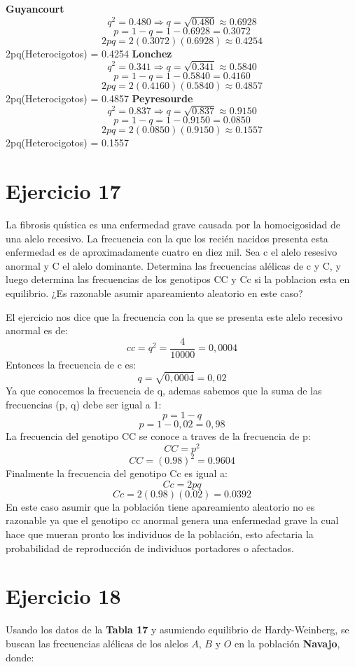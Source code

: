 \documentclass{article}
\begin{document}
\textbf{Guyancourt}
\[q^2 = 0.480 \Longrightarrow q = \sqrt{0.480} \approx 0.6928\]
\[p = 1 - q = 1 - 0.6928 = 0.3072\]
\[2pq = 2(0.3072)(0.6928) \approx 0.4254\]
2pq(Heterocigotos) = 0.4254
\textbf{Lonchez}
\[q^2 = 0.341\Longrightarrow q = \sqrt{0.341} \approx 0.5840\]
\[p = 1 - q = 1 - 0.5840 = 0.4160\]
\[2pq = 2(0.4160)(0.5840) \approx 0.4857\]
2pq(Heterocigotos) = 0.4857
\textbf{Peyresourde}
\[q^2 = 0.837 \Longrightarrow q = \sqrt{0.837} \approx 0.9150\]
\[p = 1 - q = 1 - 0.9150 = 0.0850\]
\[2pq = 2(0.0850)(0.9150) \approx 0.1557\]
2pq(Heterocigotos) = 0.1557


\section*{Ejercicio 17}
La fibrosis quística es una enfermedad grave causada por la homocigosidad de una alelo recesivo. La frecuencia con la que los recién nacidos presenta esta enfermedad es de aproximadamente cuatro en diez mil. Sea c el alelo resesivo anormal y C el alelo dominante. Determina las frecuencias alélicas de c y C, y luego determina las frecuencias de los genotipos CC y Cc si la poblacion esta en equilibrio. ¿Es razonable asumir apareamiento aleatorio en este caso?

El ejercicio nos dice que la frecuencia con la que se presenta este alelo recesivo anormal es de:
\[
cc = q^2 =\frac{4}{10000} = 0,0004
\]
Entonces la frecuencia de c es:
\[
q = \sqrt{0,0004} = 0,02
\]
Ya que conocemos la frecuencia de q, ademas sabemos que la suma de las frecuencias (p, q) debe ser igual a 1:
\[
p = 1 - q
\]
\[
p = 1 - 0,02 = 0,98
\]
La frecuencia del genotipo CC se conoce a traves de la frecuencia de p:
\[
CC = p^2
\]
\[
CC = (0.98)^2 = 0.9604
\]
Finalmente la frecuencia del genotipo Cc es igual a:
\[
Cc = 2pq
\]
\[
Cc = 2(0.98)(0.02) = 0.0392
\]
En este caso asumir que la población tiene apareamiento aleatorio no es razonable ya que el genotipo cc anormal genera una enfermedad grave la cual hace que mueran pronto los individuos de la población, esto afectaria la probabilidad de reproducción de individuos portadores o afectados.


\section*{Ejercicio 18}

Usando los datos de la \textbf{Tabla 17} y asumiendo equilibrio de Hardy-Weinberg, se buscan las frecuencias alélicas de los alelos $A$, $B$ y $O$ en la población \textbf{Navajo}, donde:
\end{document}
